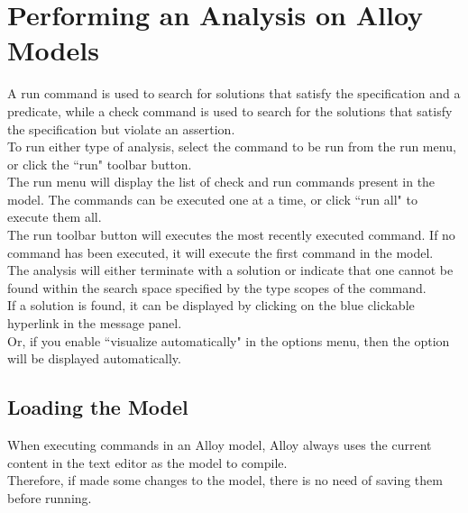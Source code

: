 \documentclass[a4paper,12pt]{extarticle}
\begin{document}
\section{Performing an Analysis on Alloy Models}
\label{Alloy Performance}
A run command is used to search for solutions that satisfy the specification and a predicate, while a check command is used to search for the solutions that satisfy the specification but violate an assertion.\\
To run either type of analysis, select the command to be run from the run menu, or click the ``run" toolbar button.\\
The run menu will display the list of check and run commands present in the model. The commands can be executed one at a time, or click ``run all" to execute them all.\\
The run toolbar button will executes the most recently executed command. If no command has been executed, it will execute the first command in the model.\\
The analysis will either terminate with a solution or indicate that one cannot be found within the search space specified by the type scopes of the command.\\
If a solution is found, it can be displayed by clicking on the blue clickable hyperlink in the message panel.\\
Or, if you enable ``visualize automatically" in the options menu, then the option will be displayed automatically.
\subsection{Loading the Model}
\label{Model loading}
When executing commands in an Alloy model, Alloy always uses the current content in the text editor as the model to compile.\\
Therefore, if made some changes to the model, there is no need of saving them before running.
\end{document}
